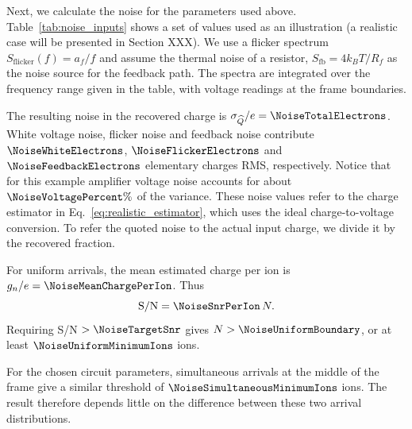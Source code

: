 Next, we calculate the noise for the parameters used above.
 Table~\ref{tab:noise_inputs} shows a set of values used as an illustration (a realistic case will be presented in Section XXX).  We use a flicker spectrum $S_{\mathrm{flicker}}(f)=a_f/f$ and assume the thermal noise of a resistor, $S_{\mathrm{fb}}=4k_BT/R_f$ as the noise source for the feedback path. The spectra are integrated over the frequency range given in the table, with voltage readings at the frame boundaries.

\begin{table}[!htbp]
 \centering
 
 \caption{Assumed noise inputs for the illustrative calculation.}
 \label{tab:noise_inputs}
\end{table}

The resulting noise in the recovered charge is $\sigma_{\widehat Q}/e=\NoiseTotalElectrons$. White voltage noise, flicker noise and feedback noise contribute $\NoiseWhiteElectrons$, $\NoiseFlickerElectrons$ and $\NoiseFeedbackElectrons$ elementary charges RMS, respectively. Notice that for this example amplifier voltage noise accounts for about $\NoiseVoltagePercent\%$ of the variance.
These noise values refer to the charge estimator in Eq.~\eqref{eq:realistic_estimator}, which uses the ideal charge-to-voltage conversion. To refer the quoted noise to the actual input charge, we divide it by the recovered fraction.

For uniform arrivals, the mean estimated charge per ion is $g_n/e=\NoiseMeanChargePerIon$. Thus
\begin{equation}
 {\rm S/N}=\NoiseSnrPerIon\,N.
 \label{eq:numerical_snr}
\end{equation}
Requiring S/N $>\NoiseTargetSnr$ gives $N>\NoiseUniformBoundary$, or at least $\NoiseUniformMinimumIons$ ions.

For the chosen circuit parameters, simultaneous arrivals at the middle of the frame give a similar threshold of $\NoiseSimultaneousMinimumIons$ ions. The result therefore depends little on the difference between these two arrival distributions.
